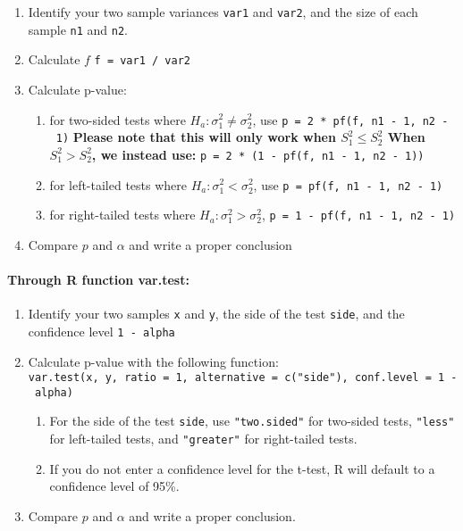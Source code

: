 \begin{enumerate}
\def\labelenumi{\arabic{enumi}.}
\item
  Identify your two sample variances \texttt{var1} and \texttt{var2},
  and the size of each sample \texttt{n1} and \texttt{n2}.
\item
  Calculate \(f\) \texttt{f\ =\ var1\ /\ var2}
\item
  Calculate p-value:

  \begin{enumerate}
  \def\labelenumii{\alph{enumii}.}
  \item
    for two-sided tests where \(H_a: \sigma^2_1 \neq \sigma^2_2\), use
    \texttt{p\ =\ 2\ *\ pf(f,\ n1\ -\ 1,\ n2\ -\ 1)} \textbf{Please note
    that this will only work when \(S^2_1 \leq S^2_2\) When
    \(S^2_1 > S^2_2\), we instead use:}
    \texttt{p\ =\ 2\ *\ (1\ -\ pf(f,\ n1\ -\ 1,\ n2\ -\ 1))}
  \item
    for left-tailed tests where \(H_a: \sigma^2_1 < \sigma^2_2\), use
    \texttt{p\ =\ pf(f,\ n1\ -\ 1,\ n2\ -\ 1)}
  \item
    for right-tailed tests where \(H_a: \sigma^2_1 > \sigma^2_2\),
    \texttt{p\ =\ 1\ -\ pf(f,\ n1\ -\ 1,\ n2\ -\ 1)}
  \end{enumerate}
\item
  Compare \(p\) and \(\alpha\) and write a proper conclusion
\end{enumerate}

\hypertarget{through-r-function-var.test}{%
\paragraph{Through R function
var.test:}\label{through-r-function-var.test}}

\begin{enumerate}
\def\labelenumi{\arabic{enumi}.}
\item
  Identify your two samples \texttt{x} and \texttt{y}, the side of the
  test \texttt{side}, and the confidence level \texttt{1\ -\ alpha}
\item
  Calculate p-value with the following function:
  \texttt{var.test(x,\ y,\ ratio\ =\ 1,\ alternative\ =\ c("side"),\ conf.level\ =\ 1\ -\ alpha)}

  \begin{enumerate}
  \def\labelenumii{\alph{enumii}.}
  \item
    For the side of the test \texttt{side}, use \texttt{"two.sided"} for
    two-sided tests, \texttt{"less"} for left-tailed tests, and
    \texttt{"greater"} for right-tailed tests.
  \item
    If you do not enter a confidence level for the t-test, R will
    default to a confidence level of 95\%.
  \end{enumerate}
\item
  Compare \(p\) and \(\alpha\) and write a proper conclusion.
\end{enumerate}

